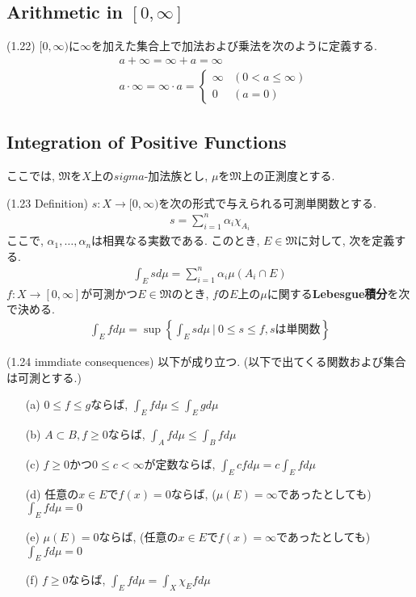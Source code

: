 \documentclass[a4paper]{jsarticle}
\begin{document}
\subsection{Arithmetic in $[0, \infty]$}
\begin{defi}{(1.22)}{}
    $[0,\infty)$に$\infty$を加えた集合上で加法および乗法を次のように定義する.
    \begin{align*}
        &a+\infty = \infty+a = \infty \\
        &a\cdot \infty = \infty\cdot a = \begin{cases}
            \infty & (0<a\leq \infty) \\
            0 & (a=0)
        \end{cases}
    \end{align*}
\end{defi}

\subsection{Integration of Positive Functions}
ここでは, $\mathfrak{M}$を$X$上の$sigma$-加法族とし, $\mu$を$\mathfrak{M}$上の正測度とする.
\begin{defi}{(1.23 Definition)}{}
    $s:X\to [0, \infty)$を次の形式で与えられる可測単関数とする.
    \begin{align*}
        s = \sum_{i=1}^n \alpha_i \chi_{A_i}
    \end{align*}
    ここで, $\alpha_1, \dots, \alpha_n$は相異なる実数である. このとき, $E\in \mathfrak{M}$に対して, 次を定義する.
    \begin{align*}
        \int_E s d\mu = \sum_{i=1}^n \alpha_i \mu(A_i\cap E)
    \end{align*}
    $f:X\to [0,\infty]$が可測かつ$E\in \mathfrak{M}$のとき, $f$の$E$上の$\mu$に関する{\bf Lebesgue積分}を次で決める.
    \begin{align*}
        \int_E f d\mu = \sup \left\{ \int_E s d\mu \ | \ 0\leq s\leq f, sは単関数 \right\}
    \end{align*}
\end{defi}

\begin{prop}{(1.24 immdiate consequences)}{}
    以下が成り立つ. (以下で出てくる関数および集合は可測とする.)
    \begin{enumerate}
        \item[(a)] $0\leq f\leq g$ならば, $\int_Efd\mu\leq \int_Egd\mu$
        \item[(b)] $A\subset B, f\geq 0$ならば, $\int_Afd\mu\leq \int_Bfd\mu$
        \item[(c)] $f\geq 0$かつ$0\leq c<\infty$が定数ならば, $\int_E cfd\mu = c\int_Efd\mu$
        \item[(d)] 任意の$x\in E$で$f(x)=0$ならば, ($\mu(E)=\infty$であったとしても)$\int_Efd\mu = 0$
        \item[(e)] $\mu(E)=0$ならば, (任意の$x\in E$で$f(x)=\infty$であったとしても)$\int_Efd\mu=0$
        \item[(f)] $f\geq 0$ならば, $\int_Efd\mu = \int_X \chi_Efd\mu$
    \end{enumerate}
\end{prop}
\end{document}
